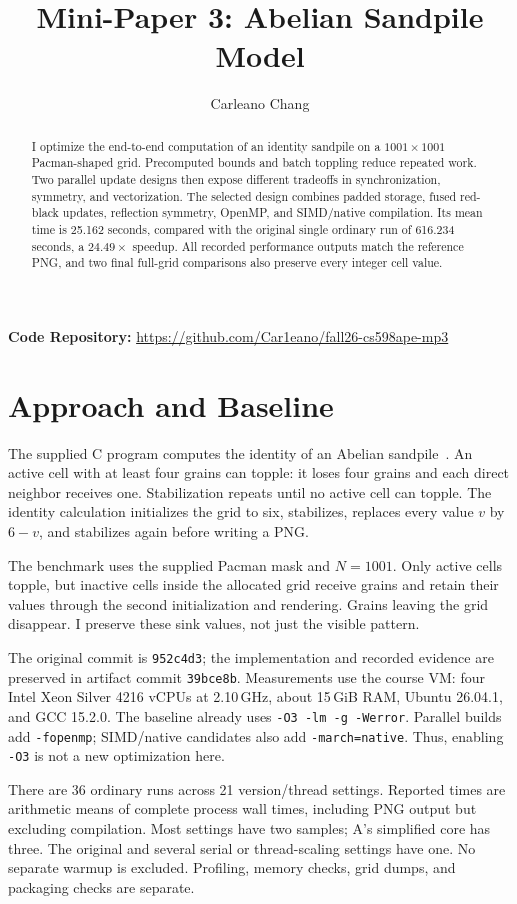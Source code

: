 \documentclass[sigplan,nonacm]{acmart}
\title{Mini-Paper 3: Abelian Sandpile Model}
\author{Carleano Chang}
\affiliation{\institution{University of Illinois Urbana-Champaign}\city{Urbana}\state{Illinois}\country{USA}}
\begin{document}
\begin{abstract}
I optimize the end-to-end computation of an identity sandpile on a $1001\times1001$ Pacman-shaped grid. Precomputed bounds and batch toppling reduce repeated work. Two parallel update designs then expose different tradeoffs in synchronization, symmetry, and vectorization. The selected design combines padded storage, fused red-black updates, reflection symmetry, OpenMP, and SIMD/native compilation. Its mean time is 25.162 seconds, compared with the original single ordinary run of 616.234 seconds, a $24.49\times$ speedup. All recorded performance outputs match the reference PNG, and two final full-grid comparisons also preserve every integer cell value.
\end{abstract}
\maketitle
\noindent\textbf{Code Repository:} \url{https://github.com/Car1eano/fall26-cs598ape-mp3}

\section{Approach and Baseline}
The supplied C program computes the identity of an Abelian sandpile~\cite{starter}. An active cell with at least four grains can topple: it loses four grains and each direct neighbor receives one. Stabilization repeats until no active cell can topple. The identity calculation initializes the grid to six, stabilizes, replaces every value $v$ by $6-v$, and stabilizes again before writing a PNG.

The benchmark uses the supplied Pacman mask and $N=1001$. Only active cells topple, but inactive cells inside the allocated grid receive grains and retain their values through the second initialization and rendering. Grains leaving the grid disappear. I preserve these sink values, not just the visible pattern.

The original commit is \texttt{952c4d3}; the implementation and recorded evidence are preserved in artifact commit \texttt{39bce8b}. Measurements use the course VM: four Intel Xeon Silver 4216 vCPUs at 2.10\,GHz, about 15\,GiB RAM, Ubuntu 26.04.1, and GCC 15.2.0. The baseline already uses \texttt{-O3 -lm -g -Werror}. Parallel builds add \texttt{-fopenmp}; SIMD/native candidates also add \texttt{-march=native}. Thus, enabling \texttt{-O3} is not a new optimization here.

There are 36 ordinary runs across 21 version/thread settings. Reported times are arithmetic means of complete process wall times, including PNG output but excluding compilation. Most settings have two samples; A's simplified core has three. The original and several serial or thread-scaling settings have one. No separate warmup is excluded. Profiling, memory checks, grid dumps, and packaging checks are separate.
\end{document}
